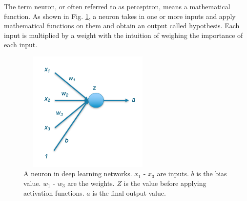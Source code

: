 The term neuron, or often referred to as perceptron, means a mathematical function. As shown in Fig. \ref{fig_neuron}, a neuron takes in one or more inputs and apply mathematical functions on them and obtain an output called hypothesis. Each input is multiplied by a weight with the intuition of weighing the importance of each input.
\begin{figure}[h!]
\begin{center}
\includegraphics[height = 6cm, width = 7cm]{img/neuron.png}
\caption[A neuron in deep learning networks]{A neuron in deep learning networks. $x_1$ - $x_3$ are inputs. $b$ is the bias value. $w_1$ - $w_3$ are the weights. $Z$ is the value before applying activation functions. $a$ is the final output value.\label{fig_neuron}}
\end{center}
\end{figure}

